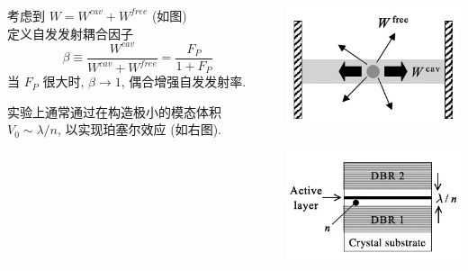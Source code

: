     \begin{frame} 
        \frametitle{}
        \begin{columns}
            \begin{column}[t]{0.69\linewidth}
            考虑到 $W= W^{cav} + W^{free} $ (如图)  \\  {\vspace*{1.3em}}
            定义自发发射耦合因子
            \[ \beta \equiv  \frac{W^{cav}}{W^{cav} + W^{free}} = \frac{F_P}{1+F_P} \]
            当 $F_P$  很大时, $\beta \to 1$, 偶合增强自发发射率. \\ {\vspace*{1.3em}}

            实验上通常通过在构造极小的模态体积$V_0 \sim \lambda /n $, 以实现珀塞尔效应 (如右图).
            \end{column}
            \begin{column}[t]{0.3\linewidth}
                  \begin{center}
                       \includegraphics[width=1.0\textwidth]{figs/2022-05-26-14-21-39.png}
                       ~\\
                       \includegraphics[width=1.0\textwidth]{figs/2022-05-26-14-49-23.png}
                  \end{center}
            \end{column}
        \end{columns}
    \end{frame}
